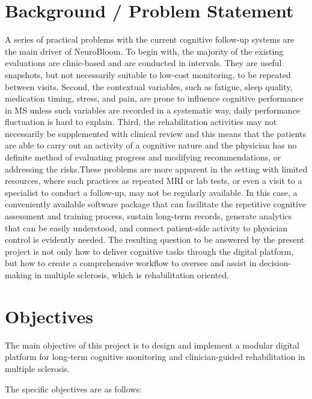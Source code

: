 \documentclass[12pt,a4paper]{report}
\begin{document}
\section{Background / Problem Statement}
A series of practical problems with the current cognitive follow-up systems are the main driver of NeuroBloom. To begin with, the majority of the existing evaluations are clinic-based and are conducted in intervals. They are useful snapshots, but not necessarily suitable to low-cost monitoring, to be repeated between visits. Second, the contextual variables, such as fatigue, sleep quality, medication timing, stress, and pain, are prone to influence cognitive performance in MS unless such variables are recorded in a systematic way, daily performance fluctuation is hard to explain. Third, the rehabilitation activities may not necessarily be supplemented with clinical review and this means that the patients are able to carry out an activity of a cognitive nature and the physician has no definite method of evaluating progress and modifying recommendations, or addressing the risks.These problems are more apparent in the setting with limited resources, where such practices as repeated MRI or lab tests, or even a visit to a specialist to conduct a follow-up, may not be regularly available. In this case, a conveniently available software package that can facilitate the repetitive cognitive assessment and training process, sustain long-term records, generate analytics that can be easily understood, and connect patient-side activity to physician control is evidently needed. The resulting question to be answered by the present project is not only how to deliver cognitive tasks through the digital platform, but how to create a comprehensive workflow to oversee and assist in decision-making in multiple sclerosis, which is rehabilitation oriented.

\section{Objectives}
The main objective of this project is to design and implement a modular digital platform for long-term cognitive monitoring and clinician-guided rehabilitation in multiple sclerosis.

The specific objectives are as follows:
\end{document}
